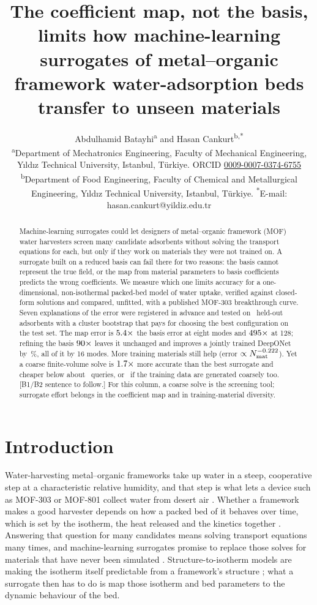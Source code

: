 \documentclass[10pt,a4paper]{article}
\title{The coefficient map, not the basis, limits how machine-learning surrogates of
metal--organic framework water-adsorption beds transfer to unseen materials}
\author{Abdulhamid Batayhi\textsuperscript{a} and Hasan Cankurt\textsuperscript{b,*}\\[0.4em]
\small \textsuperscript{a}Department of Mechatronics Engineering, Faculty of Mechanical
Engineering, Y\i{}ld\i{}z Technical University, Istanbul, T\"urkiye.
ORCID \href{https://orcid.org/0009-0007-0374-6755}{0009-0007-0374-6755}\\
\small \textsuperscript{b}Department of Food Engineering, Faculty of Chemical and
Metallurgical Engineering, Y\i{}ld\i{}z Technical University, Istanbul, T\"urkiye.
\textsuperscript{*}E-mail: hasan.cankurt@yildiz.edu.tr}
\date{}
\begin{document}
\maketitle

\begin{abstract}
\noindent
Machine-learning surrogates could let designers of metal--organic framework (MOF) water
harvesters screen many candidate adsorbents without solving the transport equations for
each, but only if they work on materials they were not trained on. A surrogate built on a
reduced basis can fail there for two reasons: the basis cannot represent the true field,
or the map from material parameters to basis coefficients predicts the wrong
coefficients. We measure which one limits accuracy for a one-dimensional, non-isothermal
packed-bed model of water uptake, verified against \nLzeroNchecks{} closed-form solutions
and compared, unfitted, with a published MOF-303 breakthrough curve. Seven explanations
of the error were registered in advance and tested on \nNclustFolds\ held-out adsorbents
with a cluster bootstrap that pays for choosing the best configuration on the test set.
The map error is \(5.4\times\) the basis error at eight modes and
\(495\times\) at 128; refining the basis \(90\times\) leaves it
unchanged and improves a jointly trained DeepONet by \nLfiveVtwoGainPct\,\%, all of it by 16
modes. More training materials still help (error \(\propto N_{\mathrm{mat}}^{-0.222}\)).
Yet a coarse finite-volume solve is \(1.7\times\) more accurate than the best
surrogate and cheaper below about \nCvsBeProd\ queries, or \nCvsBeCoarse\ if the training
data are generated coarsely too. [B1/B2 sentence to follow.] For this column, a coarse solve
is the screening tool; surrogate effort belongs in the coefficient map and in
training-material diversity.
\end{abstract}

\section{Introduction}
\label{sec:intro}

Water-harvesting metal--organic frameworks take up water in a steep, cooperative step at
a characteristic relative humidity, and that step is what lets a device such as MOF-303
or MOF-801 collect water from desert air
\cite{kim2017water,kim2018adsorption,hanikel2021evolution}. Whether a framework makes a
good harvester depends on how a packed bed of it behaves over time, which is set by the
isotherm, the heat released and the kinetics together
\cite{lapotin2019adsorption}. Answering that question for many candidates means solving
transport equations many times, and machine-learning surrogates promise to replace those
solves for materials that have never been simulated
\cite{pai2020generalized,leperi2019development,burns2020prediction}. Structure-to-isotherm
models are making the isotherm itself predictable from a framework's structure
\cite{goeminne2025ab}; what a surrogate then has to do is map those isotherm and bed
parameters to the dynamic behaviour of the bed.
\end{document}
